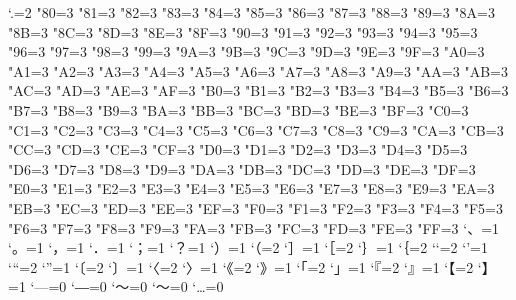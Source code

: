 \xspcode`.=2
\xspcode"80=3
\xspcode"81=3
\xspcode"82=3
\xspcode"83=3
\xspcode"84=3
\xspcode"85=3
\xspcode"86=3
\xspcode"87=3
\xspcode"88=3
\xspcode"89=3
\xspcode"8A=3
\xspcode"8B=3
\xspcode"8C=3
\xspcode"8D=3
\xspcode"8E=3
\xspcode"8F=3
\xspcode"90=3
\xspcode"91=3
\xspcode"92=3
\xspcode"93=3
\xspcode"94=3
\xspcode"95=3
\xspcode"96=3
\xspcode"97=3
\xspcode"98=3
\xspcode"99=3
\xspcode"9A=3
\xspcode"9B=3
\xspcode"9C=3
\xspcode"9D=3
\xspcode"9E=3
\xspcode"9F=3
\xspcode"A0=3
\xspcode"A1=3
\xspcode"A2=3
\xspcode"A3=3
\xspcode"A4=3
\xspcode"A5=3
\xspcode"A6=3
\xspcode"A7=3
\xspcode"A8=3
\xspcode"A9=3
\xspcode"AA=3
\xspcode"AB=3
\xspcode"AC=3
\xspcode"AD=3
\xspcode"AE=3
\xspcode"AF=3
\xspcode"B0=3
\xspcode"B1=3
\xspcode"B2=3
\xspcode"B3=3
\xspcode"B4=3
\xspcode"B5=3
\xspcode"B6=3
\xspcode"B7=3
\xspcode"B8=3
\xspcode"B9=3
\xspcode"BA=3
\xspcode"BB=3
\xspcode"BC=3
\xspcode"BD=3
\xspcode"BE=3
\xspcode"BF=3
\xspcode"C0=3
\xspcode"C1=3
\xspcode"C2=3
\xspcode"C3=3
\xspcode"C4=3
\xspcode"C5=3
\xspcode"C6=3
\xspcode"C7=3
\xspcode"C8=3
\xspcode"C9=3
\xspcode"CA=3
\xspcode"CB=3
\xspcode"CC=3
\xspcode"CD=3
\xspcode"CE=3
\xspcode"CF=3
\xspcode"D0=3
\xspcode"D1=3
\xspcode"D2=3
\xspcode"D3=3
\xspcode"D4=3
\xspcode"D5=3
\xspcode"D6=3
\xspcode"D7=3
\xspcode"D8=3
\xspcode"D9=3
\xspcode"DA=3
\xspcode"DB=3
\xspcode"DC=3
\xspcode"DD=3
\xspcode"DE=3
\xspcode"DF=3
\xspcode"E0=3
\xspcode"E1=3
\xspcode"E2=3
\xspcode"E3=3
\xspcode"E4=3
\xspcode"E5=3
\xspcode"E6=3
\xspcode"E7=3
\xspcode"E8=3
\xspcode"E9=3
\xspcode"EA=3
\xspcode"EB=3
\xspcode"EC=3
\xspcode"ED=3
\xspcode"EE=3
\xspcode"EF=3
\xspcode"F0=3
\xspcode"F1=3
\xspcode"F2=3
\xspcode"F3=3
\xspcode"F4=3
\xspcode"F5=3
\xspcode"F6=3
\xspcode"F7=3
\xspcode"F8=3
\xspcode"F9=3
\xspcode"FA=3
\xspcode"FB=3
\xspcode"FC=3
\xspcode"FD=3
\xspcode"FE=3
\xspcode"FF=3
\inhibitxspcode`、=1
\inhibitxspcode`。=1
\inhibitxspcode`，=1
\inhibitxspcode`．=1
\inhibitxspcode`；=1
\inhibitxspcode`？=1
\inhibitxspcode`）=1
\inhibitxspcode`（=2
\inhibitxspcode`］=1
\inhibitxspcode`［=2
\inhibitxspcode`｝=1
\inhibitxspcode`｛=2
\inhibitxspcode`‘=2
\inhibitxspcode`’=1
\inhibitxspcode`“=2
\inhibitxspcode`”=1
\inhibitxspcode`〔=2
\inhibitxspcode`〕=1
\inhibitxspcode`〈=2
\inhibitxspcode`〉=1
\inhibitxspcode`《=2
\inhibitxspcode`》=1
\inhibitxspcode`「=2
\inhibitxspcode`」=1
\inhibitxspcode`『=2
\inhibitxspcode`』=1
\inhibitxspcode`【=2
\inhibitxspcode`】=1
\inhibitxspcode`—=0%
\inhibitxspcode`―=0%
\inhibitxspcode`〜=0%
\inhibitxspcode`～=0%
\inhibitxspcode`…=0
